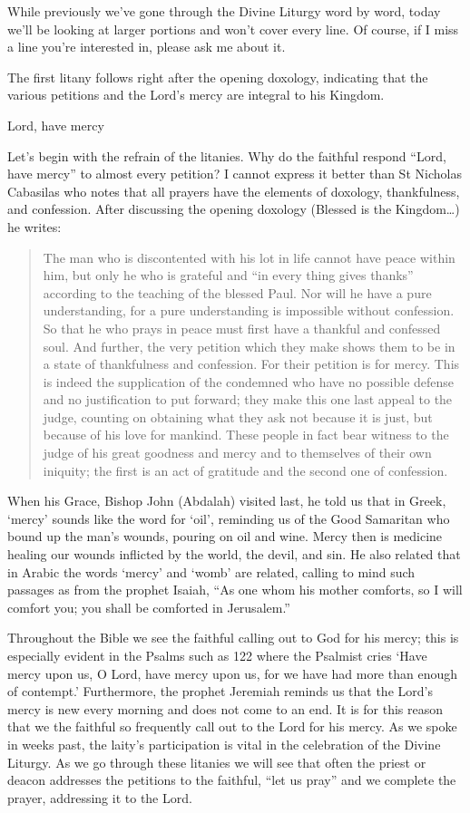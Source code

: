 \documentclass[
]{article}
\begin{document}
While previously we've gone through the Divine Liturgy word by word,
today we'll be looking at larger portions and won't cover every line. Of
course, if I miss a line you're interested in, please ask me about it.

The first litany follows right after the opening doxology, indicating
that the various petitions and the Lord's mercy are integral to his
Kingdom.

Lord, have mercy

Let's begin with the refrain of the litanies. Why do the faithful
respond ``Lord, have mercy'' to almost every petition? I cannot express
it better than St Nicholas Cabasilas who notes that all prayers have the
elements of doxology, thankfulness, and confession. After discussing the
opening doxology (Blessed is the Kingdom\ldots) he writes:

\begin{quote}
The man who is discontented with his lot in life cannot have peace
within him, but only he who is grateful and ``in every thing gives
thanks'' according to the teaching of the blessed Paul. Nor will he have
a pure understanding, for a pure understanding is impossible without
confession. So that he who prays in peace must first have a thankful and
confessed soul. And further, the very petition which they make shows
them to be in a state of thankfulness and confession. For their petition
is for mercy. This is indeed the supplication of the condemned who have
no possible defense and no justification to put forward; they make this
one last appeal to the judge, counting on obtaining what they ask not
because it is just, but because of his love for mankind. These people in
fact bear witness to the judge of his great goodness and mercy and to
themselves of their own iniquity; the first is an act of gratitude and
the second one of confession.
\end{quote}

When his Grace, Bishop John (Abdalah) visited last, he told us that in
Greek, `mercy' sounds like the word for `oil', reminding us of the Good
Samaritan who bound up the man's wounds, pouring on oil and wine. Mercy
then is medicine healing our wounds inflicted by the world, the devil,
and sin. He also related that in Arabic the words `mercy' and `womb' are
related, calling to mind such passages as from the prophet Isaiah, ``As
one whom his mother comforts, so I will comfort you; you shall be
comforted in Jerusalem.''

Throughout the Bible we see the faithful calling out to God for his
mercy; this is especially evident in the Psalms such as 122 where the
Psalmist cries `Have mercy upon us, O Lord, have mercy upon us, for we
have had more than enough of contempt.' Furthermore, the prophet
Jeremiah reminds us that the Lord's mercy is new every morning and does
not come to an end. It is for this reason that we the faithful so
frequently call out to the Lord for his mercy. As we spoke in weeks
past, the laity's participation is vital in the celebration of the
Divine Liturgy. As we go through these litanies we will see that often
the priest or deacon addresses the petitions to the faithful, ``let us
pray'' and we complete the prayer, addressing it to the Lord.
\end{document}

